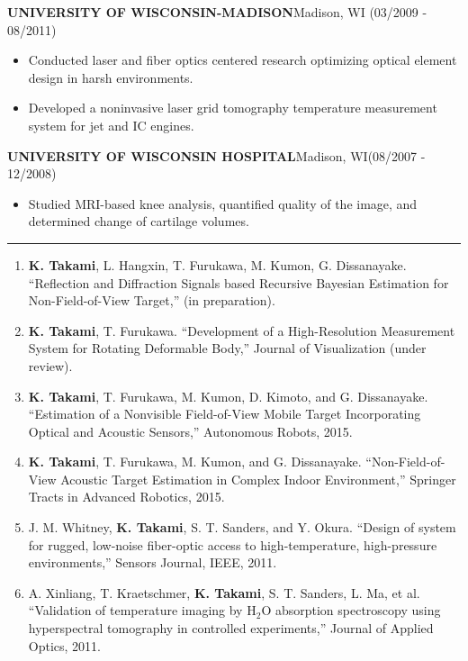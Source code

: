 \documentclass[11pt,letterpaper]{article}
\newcommand{\sect}[1]{\vspace{8mm}{\centering {\bf \large \scshape \uppercase{#1}} \par}  \vskip 2mm   {\color{blue} \hrule height 1pt}\vspace{2mm}}
\begin{document}
  \MakeUppercase{\bf University of Wisconsin-Madison}\hfill{Madison, WI}{ (03/2009 - 08/2011)}\\
  \begin{itemize}
  \item Conducted laser and fiber optics centered research optimizing optical element design in harsh environments.
  \item Developed a noninvasive laser grid tomography temperature measurement system for jet and IC engines.
  \end{itemize}

  \MakeUppercase{\bf University of Wisconsin Hospital}\hfill{Madison, WI}{ {(08/2007 - 12/2008)}}\\
  \begin{itemize}
  \item Studied MRI-based knee analysis, quantified quality of the image, and determined change of cartilage volumes.
  \end{itemize}


\pagebreak
\sect{Journal Papers}
  \begin{enumerate}
  \item {\bf K. Takami}, L. Hangxin, T. Furukawa, M. Kumon, G. Dissanayake. ``Reflection and Diffraction Signals based Recursive Bayesian Estimation for Non-Field-of-View Target,'' (in preparation).

  \item {\bf K. Takami}, T. Furukawa. ``Development of a High-Resolution Measurement System for Rotating Deformable Body,'' Journal of Visualization (under review).

  \item {\bf K. Takami}, T. Furukawa, M. Kumon, D. Kimoto, and G. Dissanayake. ``Estimation of a Nonvisible Field-of-View Mobile Target Incorporating Optical and Acoustic Sensors,'' Autonomous Robots, 2015.

  \item {\bf K. Takami}, T. Furukawa, M. Kumon, and G. Dissanayake. ``Non-Field-of-View Acoustic Target Estimation in Complex Indoor Environment,'' Springer Tracts in Advanced Robotics, 2015.

  \item J. M. Whitney, {\bf K. Takami}, S. T. Sanders, and Y. Okura. ``Design of system for rugged, low-noise fiber-optic access to high-temperature, high-pressure environments,'' Sensors Journal, IEEE, 2011.

  \item A. Xinliang, T. Kraetschmer, {\bf K. Takami}, S. T. Sanders, L. Ma, et al. ``Validation of temperature imaging by H$_2$O absorption spectroscopy using hyperspectral tomography in controlled experiments,'' Journal of Applied Optics, 2011.
\end{enumerate}
\end{document}
